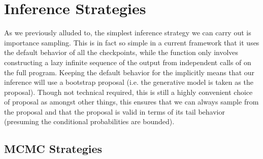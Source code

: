 
\section{Inference Strategies}
\label{sec:proginf:str}


As we previously alluded to, the simplest inference strategy we can carry out is importance
sampling.  This is in fact so simple in a current framework that it uses the default behavior
of all the checkpoints, while the \anginfer function only involves constructing a lazy infinite
sequence of the output from independent calls of  on the full program.
Keeping the default behavior for the \sample implicitly means that our
inference will use a bootstrap proposal (i.e. the generative model is taken as the proposal).
Though not technical required, this is still a highly convenient choice of proposal as
amongst other things, this ensures that we can always sample from the proposal and
that the proposal is valid in terms of its tail behavior (presuming the conditional probabilities
are bounded).

\subsection{MCMC Strategies}
\label{sec:proginf:str:lmh}

